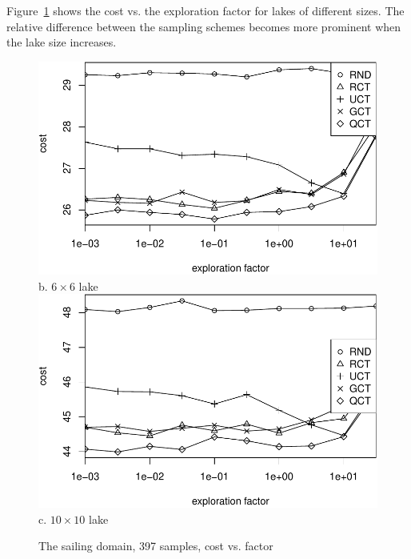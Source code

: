 \documentclass[letterpaper]{article}
\begin{document}
Figure~\ref{fig:sailing-lake-size} shows the cost vs. the exploration
factor for lakes of different sizes. The relative difference between
the sampling schemes becomes more prominent when the lake size
increases.
\begin{figure}[t]
   \centering
   \includegraphics[scale=0.45]{costs-size=6-nsamples=397.pdf}\\
   b. $6\times 6$ lake \\
   \vspace{1em}
   \includegraphics[scale=0.45]{costs-size=10-nsamples=397.pdf}\\
   c. $10\times 10$ lake
  \caption{The sailing domain, 397 samples, cost vs. factor}
  \label{fig:sailing-lake-size}
\end{figure}
\end{document}
